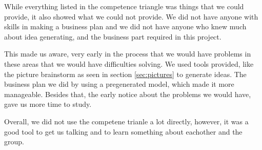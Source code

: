 While everything listed in the competence triangle was things that we could provide, it also showed what we could not provide.
We did not have anyone with skills in making a business plan and we did not have anyone who knew much about idea generating, and the business part required in this project.

This made us aware, very early in the process that we would have problems in these areas that we would have difficulties solving. We used tools provided, like the picture brainstorm as seen in section \ref{sec:pictures} to generate ideas. The business plan we did by using a pregenerated model, which made it more manageable. Besides that, the early notice about the problems we would have, gave us more time to study. 

Overall, we did not use the competene trianle a lot directly, however, it was a good tool to get us talking and to learn something about eachother and the group. 
